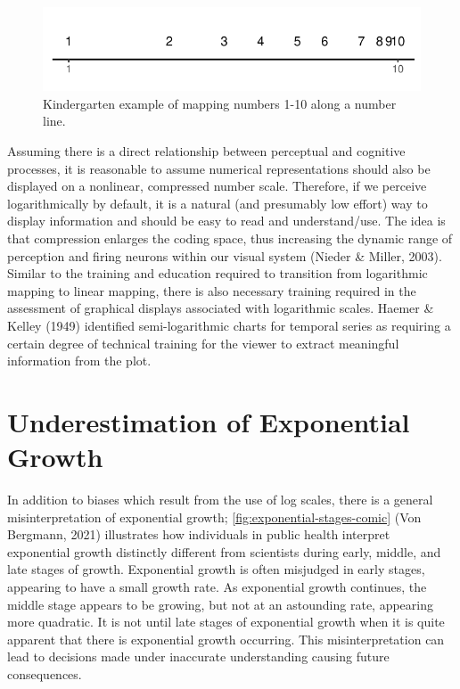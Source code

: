 \documentclass[print]{nuthesis}
\begin{document}
\begin{figure}[tbp]

{\centering \includegraphics[width=0.65\linewidth,]{thesis_files/figure-latex/log-number-line-1} 

}

\caption[Kindergarten example of mapping numbers 1-10 along a number line]{Kindergarten example of mapping numbers 1-10 along a number line.}\label{fig:log-number-line}
\end{figure}

Assuming there is a direct relationship between perceptual and cognitive processes, it is reasonable to assume numerical representations should also be displayed on a nonlinear, compressed number scale. Therefore, if we perceive logarithmically by default, it is a natural (and presumably low effort) way to display information and should be easy to read and understand/use.
The idea is that compression enlarges the coding space, thus increasing the dynamic range of perception and firing neurons within our visual system (Nieder \& Miller, 2003).
Similar to the training and education required to transition from logarithmic mapping to linear mapping, there is also necessary training required in the assessment of graphical displays associated with logarithmic scales. Haemer \& Kelley (1949) identified semi-logarithmic charts for temporal series as requiring a certain degree of technical training for the viewer to extract meaningful information from the plot.

\hypertarget{underestimation}{%
\section{Underestimation of Exponential Growth}\label{underestimation}}

In addition to biases which result from the use of log scales, there is a general misinterpretation of exponential growth; \cref{fig:exponential-stages-comic} (Von Bergmann, 2021) illustrates how individuals in public health interpret exponential growth distinctly different from scientists during early, middle, and late stages of growth.
Exponential growth is often misjudged in early stages, appearing to have a small growth rate.
As exponential growth continues, the middle stage appears to be growing, but not at an astounding rate, appearing more quadratic.
It is not until late stages of exponential growth when it is quite apparent that there is exponential growth occurring.
This misinterpretation can lead to decisions made under inaccurate understanding causing future consequences.
\end{document}
